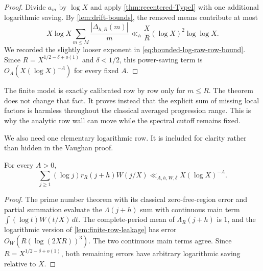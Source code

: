 \begin{proof}
Divide $a_m$ by $\log X$ and apply
\cref{thm:recentered-TypeI} with one additional logarithmic saving.  By
\cref{lem:drift-bounds}, the removed means contribute at most
\[
 X\log X\sum_{m\le M}\frac{|\Delta_{h,R}(m)|}{m}
 \ll_h\frac XR(\log X)^2\log\log X.
\]
We recorded the slightly looser exponent in
\eqref{eq:bounded-log-raw-row-bound}.  Since
$R=X^{1/2-\delta+o(1)}$ and $\delta<1/2$, this power-saving term is
$O_A(X(\log X)^{-A})$ for every fixed $A$.
\end{proof}

\begin{remark}
The finite model is exactly calibrated row by row only for $m\le R$.
The theorem does not change that fact.  It proves instead that the
explicit sum of missing local factors is harmless throughout the
classical averaged progression range.  This is why the analytic row wall
can move while the spectral cutoff remains fixed.
\end{remark}

We also need one elementary logarithmic row.  It is included for clarity
rather than hidden in the Vaughan proof.

\begin{lemma}
\label{lem:modulus-one-log-row}
For every $A>0$,
\begin{equation}
 \sum_{j\ge1}(\log j)r_R(j+h)W(j/X)
 \ll_{A,h,W,\delta}X(\log X)^{-A}.
 \label{eq:modulus-one-log-row}
\end{equation}
\end{lemma}

\begin{proof}
The prime number theorem with its classical zero-free-region error and
partial summation evaluate the $\Lambda(j+h)$ sum with continuous main
term $\int (\log t)W(t/X)\,dt$.  The complete-period mean of
$\Lambda_R(j+h)$ is $1$, and the logarithmic version of
\cref{lem:finite-row-leakage} has error
$O_W(R(\log(2XR))^3)$.  The two continuous main terms agree.  Since
$R=X^{1/2-\delta+o(1)}$, both remaining errors have arbitrary logarithmic
saving relative to $X$.
\end{proof}
